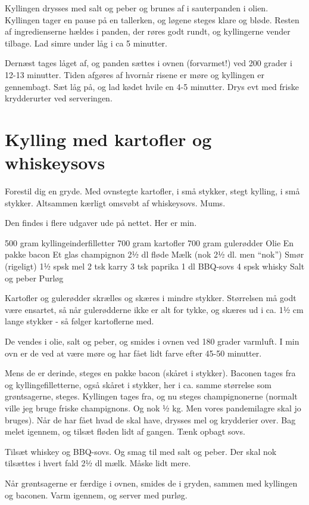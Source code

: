 \documentclass[
]{book}
\begin{document}
Kyllingen drysses med salt og peber og brunes af i sauterpanden i olien. Kyllingen tager en pause på en tallerken, og løgene steges klare og bløde. Resten af ingredienserne hældes i panden, der røres godt rundt, og kyllingerne vender tilbage. Lad simre under låg i ca 5 minutter.

Dernæst tages låget af, og panden sættes i ovnen (forvarmet!) ved 200 grader i 12-13 minutter. Tiden afgøres af hvornår risene er møre og kyllingen er gennembagt. Sæt låg på, og lad kødet hvile en 4-5 minutter. Drys evt med friske krydderurter ved serveringen.

\section{Kylling med kartofler og whiskeysovs}\label{kylling-med-kartofler-og-whiskeysovs}

Forestil dig en gryde. Med ovnstegte kartofler, i små stykker, stegt kylling, i små stykker. Altsammen kærligt omsvøbt af whiskeysovs. Mums.

Den findes i flere udgaver ude på nettet. Her er min.

500 gram kyllingeinderfilletter
700 gram kartofler
700 gram gulerødder
Olie
En pakke bacon
Et glas champignon
2½ dl fløde
Mælk (nok 2½ dl. men ``nok'')
Smør (rigeligt)
1½ spsk mel
2 tsk karry
3 tsk paprika
1 dl BBQ-sovs
4 spsk whisky
Salt og peber
Purløg

Kartofler og gulerødder skrælles og skæres i mindre stykker. Størrelsen må godt være ensartet, så når gulerødderne ikke er alt for tykke, og skæres ud i ca. 1½ cm lange stykker - så følger kartoflerne med.

De vendes i olie, salt og peber, og smides i ovnen ved 180 grader varmluft. I min ovn er de ved at være møre og har fået lidt farve efter 45-50 minutter.

Mens de er derinde, steges en pakke bacon (skåret i stykker). Baconen tages fra og kyllingefilletterne, også skåret i stykker, her i ca. samme størrelse som grøntsagerne, steges. Kyllingen tages fra, og nu steges champignonerne (normalt ville jeg bruge friske champignons. Og nok ½ kg. Men vores pandemilagre skal jo bruges). Når de har fået hvad de skal have, drysses mel og krydderier over. Bag melet igennem, og tilsæt fløden lidt af gangen. Tænk opbagt sovs.

Tilsæt whiskey og BBQ-sovs. Og smag til med salt og peber. Der skal nok tilsættes i hvert fald 2½ dl mælk. Måske lidt mere.

Når grøntsagerne er færdige i ovnen, smides de i gryden, sammen med kyllingen og baconen. Varm igennem, og server med purløg.
\end{document}
